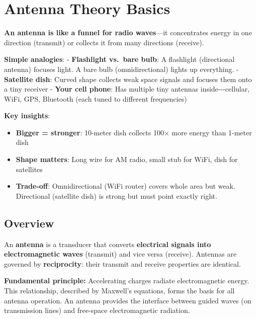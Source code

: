 \chapter{Antenna Theory Basics}
\label{ch:antenna-theory}

\begin{nontechnical}
\textbf{An antenna is like a funnel for radio waves}---it concentrates energy in one direction (transmit) or collects it from many directions (receive).

\textbf{Simple analogies}: - \textbf{Flashlight vs.~bare bulb}: A
flashlight (directional antenna) focuses light. A bare bulb
(omnidirectional) lights up everything. - \textbf{Satellite dish}:
Curved shape collects weak space signals and focuses them onto a tiny
receiver - \textbf{Your cell phone}: Has multiple tiny antennas
inside-\/-\/-cellular, WiFi, GPS, Bluetooth (each tuned to different
frequencies)

\textbf{Key insights}:
\begin{itemize}
\item \textbf{Bigger = stronger}: 10-meter dish collects 100$\times$ more energy than 1-meter dish
\item \textbf{Shape matters}: Long wire for AM radio, small stub for WiFi, dish for satellites
\item \textbf{Trade-off}: Omnidirectional (WiFi router) covers whole area but weak. Directional (satellite dish) is strong but must point exactly right.
\end{itemize}
\end{nontechnical}

\section{Overview}

An \textbf{antenna} is a transducer that converts \textbf{electrical signals into electromagnetic waves} (transmit) and vice versa (receive). Antennas are governed by \textbf{reciprocity}: their transmit and receive properties are identical.

\begin{keyconcept}
\textbf{Fundamental principle:} Accelerating charges radiate electromagnetic energy. This relationship, described by Maxwell's equations, forms the basis for all antenna operation. An antenna provides the interface between guided waves (on transmission lines) and free-space electromagnetic radiation.
\end{keyconcept}

